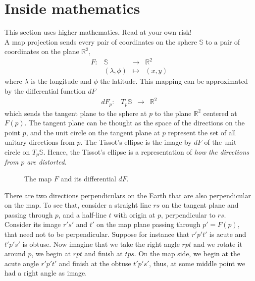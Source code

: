 \documentclass[a4paper,12pt]{article}
\begin{document}
\newpage
\section{Inside mathematics}
\textsf{This section uses higher mathematics. Read at your own risk!} \\

A map projection sends every pair of coordinates on the sphere $\mathbb S$ to a pair of coordinates on the plane $\mathbb
R^2$,
$$\begin{array}{rccc}
   F: &\mathbb S & \longrightarrow & \mathbb R^2 \\
  & (\lambda, \phi) & \mapsto & (x,y)
  \end{array}
$$
where $\lambda$ is the longitude and $\phi$ the latitude. This mapping can be approximated by the differential function $dF$
$$\begin{array}{rccc}
   dF_p: & T_p \mathbb S & \longrightarrow & \mathbb R^2 
  \end{array}
$$
which sends the tangent plane to the sphere at $p$ to the plane $\mathbb R^2$ centered at $F(p)$. The tangent plane can be thought as the space of the directions on the point $p$, and the unit circle on the tangent plane at $p$ represent the set of all unitary directions from $p$. The Tissot's ellipse is the image by $dF$ of the unit circle on $T_p\mathbb S$. Hence, the Tissot's ellipse is a representation of \emph{how the directions from $p$ are distorted}.

\begin{figure}[h]
 \begin{center}
  \def\svgwidth{ 0.85 \textwidth}

\caption{The map $F$ and its differential $dF$.}
 \end{center}
\end{figure}

There are two directions perpendiculars on the Earth that are also perpendicular on the map. To see that, consider a straight line $rs$ on the tangent plane and passing through $p$, and a half-line $t$ with origin at $p$, perpendicular to $rs$. Consider its image $r's'$ and $t'$ on the map plane passing through $p'=F(p)$, that need not to be perpendicular. Suppose for instance that $r'p't'$ is acute and $t'p's'$ is obtuse. Now imagine that we take the right angle $rpt$ and we rotate it around $p$, we begin at $rpt$ and finish at $tps$. On the map side, we begin at the acute angle  $r'p't'$ and finish at the obtuse $t'p's'$, thus, at some middle point we had a right angle as image. 
\end{document}
